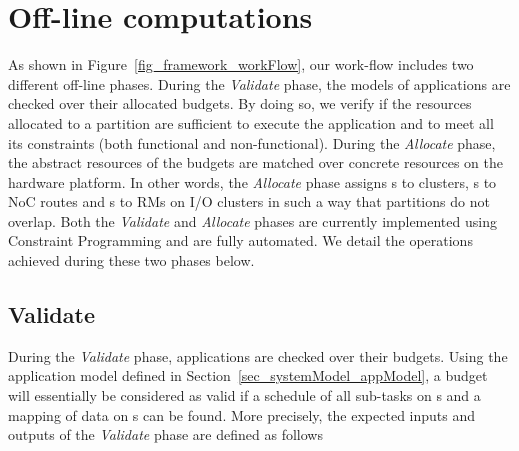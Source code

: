 \documentclass[main.tex]{subfiles}
\begin{document}
\section{Off-line computations}
\label{sec_framework_offLineComputations}
As shown in Figure~\ref{fig_framework_workFlow}, our work-flow includes two
different off-line phases. During the \emph{Validate} phase, the models of
applications are checked over their allocated budgets. By doing so, we verify
if the resources allocated to a partition are sufficient to execute the
application and to meet all its constraints (both functional and
non-functional). During the \emph{Allocate} phase, the abstract resources of
the budgets are matched over concrete resources on the hardware platform. In
other words, the \emph{Allocate} phase assigns \PN{}s to clusters, \PC{}s to
NoC routes and \ION{}s to RMs on I/O clusters in such a way that partitions do
not overlap. Both the \emph{Validate} and \emph{Allocate} phases are currently
implemented using Constraint Programming and are fully automated. We detail the
operations achieved during these two phases below.

\subsection{Validate} During the \emph{Validate} phase, applications are
checked over their budgets. Using the application model defined in
Section~\ref{sec_systemModel_appModel}, a budget will essentially be considered
as valid if a schedule of all sub-tasks on \PN{}s and a mapping of data on
\PC{}s can be found. More precisely, the expected inputs and outputs of the
\emph{Validate} phase are defined as follows
\end{document}
